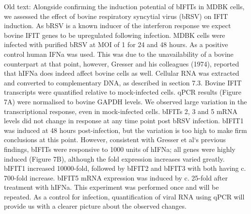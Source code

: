 Old text:
Alongside confirming the induction potential of bIFITs in MDBK cells, we assessed the effect of bovine respiratory syncytial virus (bRSV) on IFIT induction. As bRSV is a known inducer of the interferon response we expect bovine IFIT genes to be upregulated following infection. MDBK cells were infected with purified bRSV at MOI of 1 for 24 and 48 hours. As a positive control human IFNa was used. This was due to the unavailability of a bovine counterpart at that point, however, Gresser and his colleagues (1974), reported that hIFNa does indeed affect bovine cells as well. Cellular RNA was extracted and converted to complementary DNA, as described in section 7.3. Bovine IFIT transcripts were quantified relative to mock-infected cells. qPCR results (Figure 7A) were normalised to bovine GAPDH levels. We observed large variation in the transcriptional response, even in mock-infected cells. bIFITs 2, 3 and 5 mRNA levels did not change in response at any time point post bRSV infection. bIFIT1 was induced at 48 hours post-infection, but the variation is too high to make firm conclusions at this point. However, consistent with Gresser et al`s previous findings, bIFITs were responsive to 1000 units of hIFNa; all genes were highly induced (Figure 7B), although the fold expression increases varied greatly. bIFIT1 increased 10000-fold, followed by bIFIT2 and bIFIT3 with both having c. 700-fold increase. bIFIT5 mRNA expression was induced by c. 25-fold after treatment with hIFNa. This experiment was performed once and will be repeated. As a control for infection, quantification of viral RNA using qPCR will provide us with a clearer picture about the observed changes.


